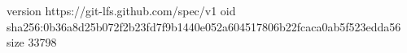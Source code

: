 version https://git-lfs.github.com/spec/v1
oid sha256:0b36a8d25b072f2b23fd7f9b1440e052a604517806b22fcaca0ab5f523edda56
size 33798
